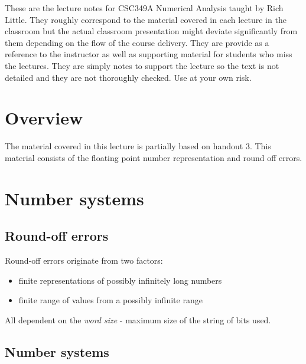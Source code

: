 \documentclass [titlepage,12pt,letter] {article}
\begin{document}
 


These are the lecture notes for CSC349A Numerical Analysis taught by
Rich Little. They roughly correspond to
the material covered in each lecture in the classroom but the actual
classroom presentation might deviate significantly from them depending
on the flow of the course delivery. They are provide as a reference to
the instructor as well as supporting material for students who miss
the lectures. They are simply notes to support the lecture so the text
is not detailed and they are not thoroughly checked. Use at your own
risk. 

\section{Overview} 

The material covered in this lecture is partially based on handout 3.  
This material consists of the floating point number
representation and round off errors. 

\section{Number systems}

\subsection{Round-off errors}

Round-off errors originate from two factors:

\begin{itemize}
\item{finite representations of possibly infinitely long numbers}
\item{finite range of values from a possibly infinite range}
\end{itemize}

All dependent on the {\it word size} - maximum size of the string of bits used.



\subsection{Number systems}
\end{document}

